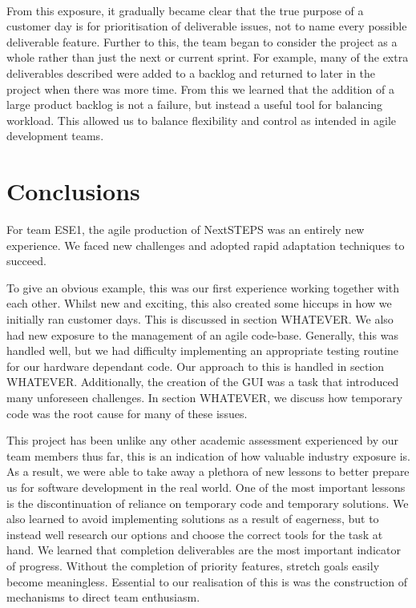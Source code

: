 \documentclass{l3proj}
\begin{document}
\\
From this exposure, it gradually became clear that the true purpose of a customer day is for prioritisation of deliverable issues, not to name every possible deliverable feature. Further to this, the team began to consider the project as a whole rather than just the next or current sprint. For example, many of the extra deliverables described were added to a backlog and returned to later in the project when there was more time. From this we learned that the addition of a large product backlog is not a failure, but instead a useful tool for balancing workload. This allowed us to balance flexibility and control as intended in agile development teams\cite{rising}.


\section{Conclusions}
For team ESE1, the agile production of NextSTEPS was an entirely new experience. We faced new challenges and adopted rapid adaptation techniques to succeed. 

To give an obvious example, this was our first experience working together with each other. Whilst new and exciting, this also created some hiccups in how we initially ran customer days. This is discussed in section WHATEVER. We also had new exposure to the management of an agile code-base. Generally, this was handled well, but we had difficulty implementing an appropriate testing routine for our hardware dependant code. Our approach to this is handled in section WHATEVER. Additionally, the creation of the GUI was a task that introduced many unforeseen challenges. In section WHATEVER, we discuss how temporary code was the root cause for many of these issues. 

This project has been unlike any other academic assessment experienced by our team members thus far, this is an indication of how valuable industry exposure is. As a result, we were able to take away a plethora of new lessons to better prepare us for software development in the real world. One of the most important lessons is the discontinuation of reliance on temporary code and temporary solutions. We also learned to avoid implementing solutions as a result of eagerness, but to instead well research our options and choose the correct tools for the task at hand. We learned that completion deliverables are the most important indicator of progress. Without the completion of priority features, stretch goals easily become meaningless. Essential to our realisation of this is was the construction of mechanisms to direct team enthusiasm. 
\end{document}
